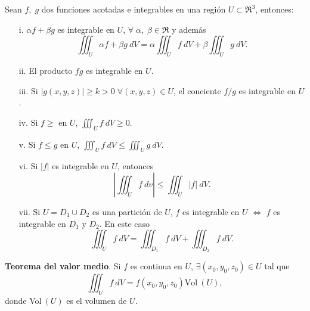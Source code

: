 \begin{propertie}
    Sean $f,\;g$ dos funciones acotadas e integrables en una regi\'on $U\subset\Re^3$, entonces:
    \begin{enumerate}
        \item[i.] $\alpha f+\beta g$ es integrable en $U$, $\forall\;\alpha,\;\beta\in\Re$ y adem\'as
        \[
            \iiint_U \alpha f+\beta g\:dV=\alpha\iiint_U f\:dV+\beta\iiint_U g\:dV.
        \]
        \item[ii.] El producto $fg$ es integrable en $U$.
        \item[iii.] Si $|g(x,y,z)|\geq k>0\;\forall(x,y,z)\in U$, el conciente $f/g$ es integrable en $U$.
        \item[iv.] Si $f\geq$ en $U$, $\iiint_U f\:dV\geq0$.
        \item[v.]Si $f\leq g$ en $U$, $\iiint_U f\:dV\leq\iiint_U g\:dV.$
        \item[vi.]Si $|f|$ es integrable en $U$, entonces 
        \[
            \left|\iiint_U f\:dv\right|\leq\iiint_U|f|\:dV.  
        \]    
        \item[vii.] Si $U=D_1\cup D_2$ es una partici\'on de $U$, $f$ es integrable en $U$ $\iff$ $f$ es integrable en $D_1$ y $D_2$. En este caso 
        \[
            \iiint_U f\:dV=\iiint_{D_1} f\:dV+\iiint_{D_2}f\:dV.    
        \]
    \end{enumerate}
\end{propertie}

\begin{theorem}
    \textbf{Teorema del valor medio}. Si $f$ es continua en $U$, $\exists(x_0,y_0,z_0)\in U$ tal que 
    \[
        \iiint_U f\:dV=f(x_0,y_0,z_0)\text{Vol}\:(U),
    \]
    donde Vol$\:(U)$ es el volumen de $U$. 
\end{theorem}

